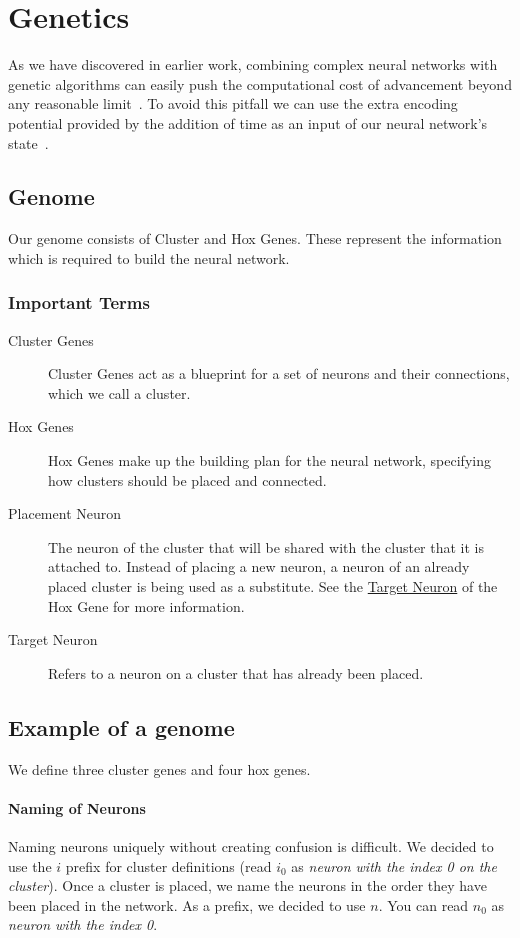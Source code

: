 \section{Genetics}

As we have discovered in earlier work, combining complex neural networks 
with genetic algorithms can easily push the computational cost of advancement
beyond any reasonable limit~\cite{Ferner2017}.
To avoid this pitfall we can use the extra encoding potential provided by 
the addition of time as an input of our neural network's state~\cite{Paugam-Moisy2012}.

\subsection{Genome}
Our genome consists of Cluster and Hox Genes.
These represent the information which is required to build the neural network.

\subsubsection{Important Terms}
\begin{description}
	\item[Cluster Genes] Cluster Genes act as a blueprint for a set of neurons and their connections, which we call a cluster.
	\item[Hox Genes] Hox Genes make up the building plan for the neural network,
	specifying how clusters should be placed and connected.
	\item[Placement Neuron] The neuron of the cluster that will be shared with the cluster that it is attached to. Instead of placing a new neuron, a neuron of an already placed cluster is being used as a substitute. See the \hyperref[item:target neuron]{Target Neuron} of the Hox Gene for more information.
	\item[Target Neuron\label{item:target neuron}] Refers to a neuron on a cluster that has already been placed.
\end{description}

\label{Example of a genome}
\subsection{Example of a genome}
We define three cluster genes and four hox genes.

\paragraph{Naming of Neurons}
Naming neurons uniquely without creating confusion is difficult. We decided to use the $i$ prefix for cluster definitions (read $i_0$ as \emph{neuron with the index 0 on the cluster}).
Once a cluster is placed, we name the neurons in the order they have been placed in the network. As a prefix, we decided to use $n$. You can read $n_0$ as \emph{neuron with the index 0}.

